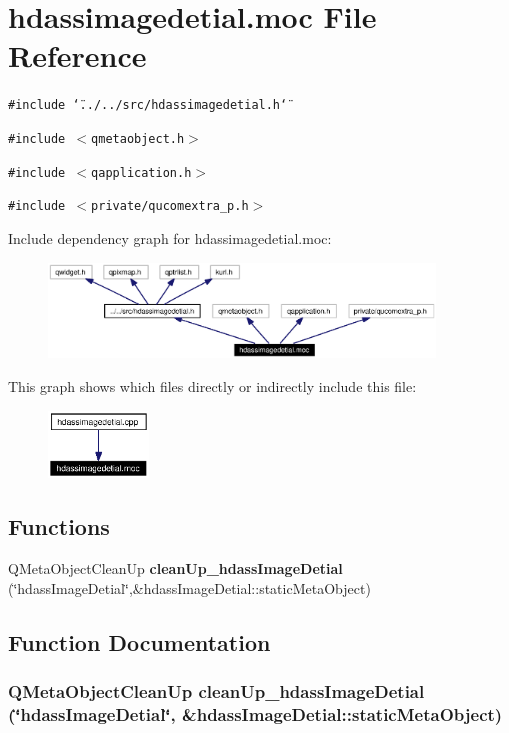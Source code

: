 \section{hdassimagedetial.moc File Reference}
\label{hdassimagedetial_8moc}


{\tt \#include \char`\"{}../../src/hdassimagedetial.h\char`\"{}}\par
{\tt \#include $<$qmetaobject.h$>$}\par
{\tt \#include $<$qapplication.h$>$}\par
{\tt \#include $<$private/qucomextra\_\-p.h$>$}\par


Include dependency graph for hdassimagedetial.moc:\begin{figure}[H]
\begin{center}
\leavevmode
\includegraphics[width=291pt]{hdassimagedetial_8moc__incl}
\end{center}
\end{figure}


This graph shows which files directly or indirectly include this file:\begin{figure}[H]
\begin{center}
\leavevmode
\includegraphics[width=76pt]{hdassimagedetial_8moc__dep__incl}
\end{center}
\end{figure}
\subsection*{Functions}
\begin{CompactItemize}
\item 
QMeta\-Object\-Clean\-Up {\bf clean\-Up\_\-hdass\-Image\-Detial} (\char`\"{}hdass\-Image\-Detial\char`\"{},\&hdass\-Image\-Detial::static\-Meta\-Object)
\end{CompactItemize}


\subsection{Function Documentation}
\subsubsection{\setlength{\rightskip}{0pt plus 5cm}QMeta\-Object\-Clean\-Up clean\-Up\_\-hdass\-Image\-Detial (\char`\"{}hdass\-Image\-Detial\char`\"{}, \&hdass\-Image\-Detial::static\-Meta\-Object)\hspace{0.3cm}{\tt  [static]}}\label{hdassimagedetial_8moc_a0}


